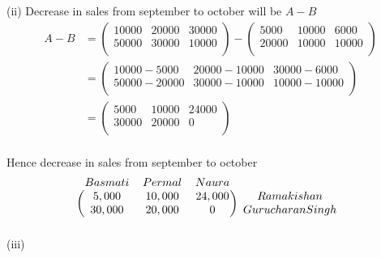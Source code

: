 \documentclass{article}
\begin{document}
\newpage
(ii) Decrease in sales from september to october will be $A-B$\\
\begin{equation*}
\begin{split}
    A-B &= \begin{pmatrix} 
            10000 & 20000 & 30000\\50000 & 30000 &10000 \\ \end{pmatrix}-\begin{pmatrix} 5000 & 10000 & 6000\\20000 & 10000 & 10000 \\ 
            \end{pmatrix}\\
        &=\begin{pmatrix} 
             10000-5000 & 20000-10000 & 30000-6000\\50000-20000 & 30000-10000 &10000-10000 \\ 
        \end{pmatrix}\\
        &=\begin{pmatrix} 
            5000 & 10000 & 24000\\30000 & 20000 & 0 \\ \end{pmatrix}\\
\end{split}
    
\end{equation*}


Hence decrease in sales from september to october\\
\[\begin{blockarray}{cccc}
Basmati & Permal & Naura \\
\begin{block}{(ccc)c}
  5,000 & 10,000& 24,000 & Ramakishan\\
30,000 &20,000 & 0 & Gurucharan Singh\\
\end{block}
\end{blockarray}
\]
(iii)
\end{document}
